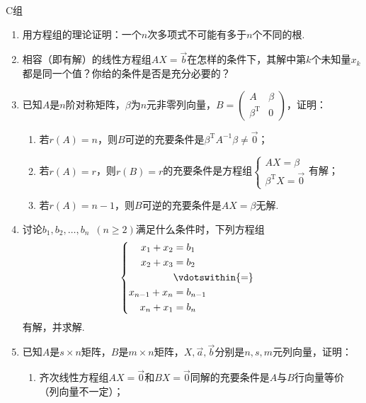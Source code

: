 \centerline{\heiti C组}
\begin{enumerate}
    \item 用方程组的理论证明：一个$n$次多项式不可能有多于$n$个不同的根.

    \item 相容（即有解）的线性方程组$AX=\vec{b}$在怎样的条件下，其解中第$k$个未知量$x_k$都是同一个值？你给的条件是否是充分必要的？

    \item 已知$A$是$n$阶对称矩阵，$\beta$为$n$元非零列向量，$B=\begin{pmatrix}
                  A & \beta \\ \beta^\mathrm{T} & 0
              \end{pmatrix}$，证明：
          \begin{enumerate}
              \item 若$r(A)=n$，则$B$可逆的充要条件是$\beta^\mathrm{T}A^{-1}\beta \neq \vec{0}$；

              \item 若$r(A)=r$，则$r(B)=r$的充要条件是方程组$\begin{cases}
                            AX=\beta \\ \beta^\mathrm{T}X=\vec{0}
                        \end{cases}$有解；

              \item 若$r(A)=n-1$，则$B$可逆的充要条件是$AX=\beta$无解.
          \end{enumerate}

    \item 讨论$b_1,b_2,\ldots,b_n\enspace(n \geqslant 2)$满足什么条件时，下列方程组
          \[\begin{cases} \begin{aligned}
                      x_1+x_2     & =b_1            \\
                      x_2+x_3     & =b_2            \\
                                  & \vdotswithin{=} \\
                      x_{n-1}+x_n & =b_{n-1}        \\
                      x_n+x_1     & =b_n
                  \end{aligned} \end{cases}\]有解，并求解.

    \item 已知$A$是$s \times n$矩阵，$B$是$m \times n$矩阵，$X,\vec{a},\vec{b}$分别是$n,s,m$元列向量，证明：
          \begin{enumerate}
              \item 齐次线性方程组$AX=\vec{0}$和$BX=\vec{0}$同解的充要条件是$A$与$B$行向量等价（列向量不一定）；


\end{enumerate}
\end{enumerate}
